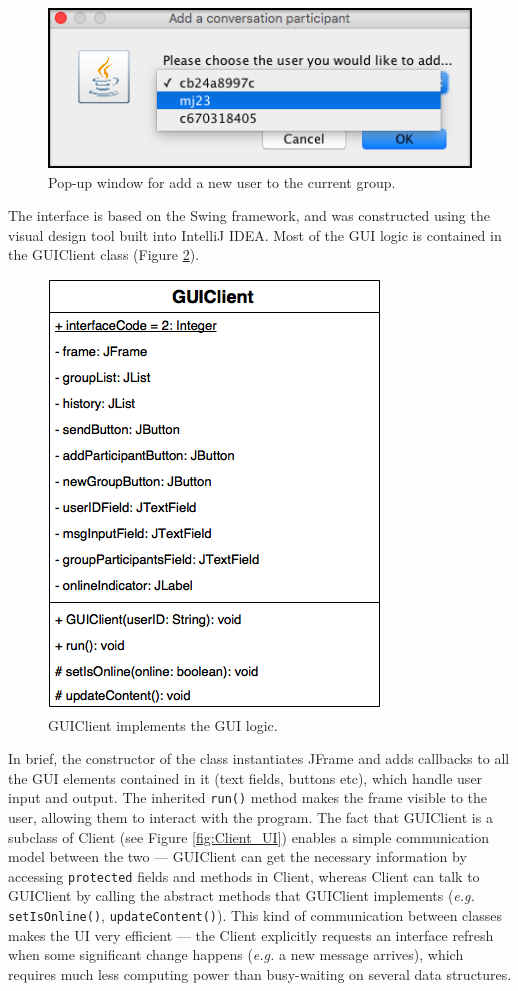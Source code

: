 \documentclass[a4paper, twoside, 12pt]{report}
\begin{document}
\begin{figure}[H]
    \captionsetup{width=0.84\textwidth}
    \centering
    \includegraphics[width=0.5\linewidth]{pics/GUI_add.png}
    \caption{\label{fig:GUI_add} Pop-up window for add a new user to the current group.}
\end{figure}

The interface is based on the Swing framework, and was constructed using the visual design tool built into IntelliJ IDEA. Most of the GUI logic is contained in the GUIClient class (Figure \ref{fig:GUIClient}).

\begin{figure}[H]
    \captionsetup{width=0.84\textwidth}
    \centering
    \includegraphics[width=0.45\linewidth]{pics/GUIClient.png}
    \caption{\label{fig:GUIClient} GUIClient implements the GUI logic.}
\end{figure}
In brief, the constructor of the class instantiates JFrame and adds callbacks to all the GUI elements contained in  it (text fields, buttons etc), which handle user input and output. The inherited \texttt{run()} method makes the frame visible to the user, allowing them to interact with the program. The fact that GUIClient is a subclass of Client (see Figure \ref{fig:Client_UI}) enables a simple communication model between the two --- GUIClient can get the necessary information by accessing \texttt{protected} fields and methods in Client, whereas Client can talk to GUIClient by calling the abstract methods that GUIClient implements (\textit{e.g.} \texttt{setIsOnline()}, \texttt{updateContent()}). This kind of communication between classes makes the UI very efficient --- the Client explicitly requests an interface refresh when some significant change happens (\textit{e.g.} a new message arrives), which requires much less computing power than busy-waiting on several data structures.
\end{document}
